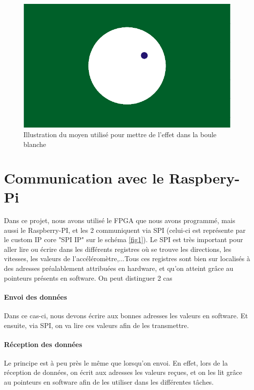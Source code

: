 \begin{figure}[!ht]
\centering
\includegraphics[scale=0.6]{img/accel.png}
\caption{Illustration du moyen utilisé pour mettre de l'effet dans la boule blanche}
\label{fig7}
\end{figure}
\newpage
\section{Communication avec le Raspbery-Pi}

Dans ce projet, nous avons utilisé le FPGA que nous avons programmé, mais aussi le Raspberry-PI, et les 2 communiquent via SPI (celui-ci est représente par le custom IP core "SPI IP" sur le schéma \ref{fig1}). Le SPI est très important pour aller lire ou écrire dans les différents registres où se trouve les directions, les vitesses, les valeurs de l'accéléromètre,...Tous ces registres sont bien sur localisés à des adresses préalablement attribuées en hardware, et qu'on atteint grâce au pointeurs présents en software. On peut distinguer 2 cas

\paragraph{Envoi des données}

Dans ce cas-ci, nous devons écrire aux bonnes adresses les valeurs en software. Et ensuite, via SPI, on va lire ces valeurs afin de les transmettre.

\paragraph{Réception des données}

Le principe est à peu près le même que lorsqu'on envoi. En effet, lors de la réception de données, on écrit aux adresses les valeurs reçues, et on les lit grâce au pointeurs en software afin de les utiliser dans les différentes tâches.


